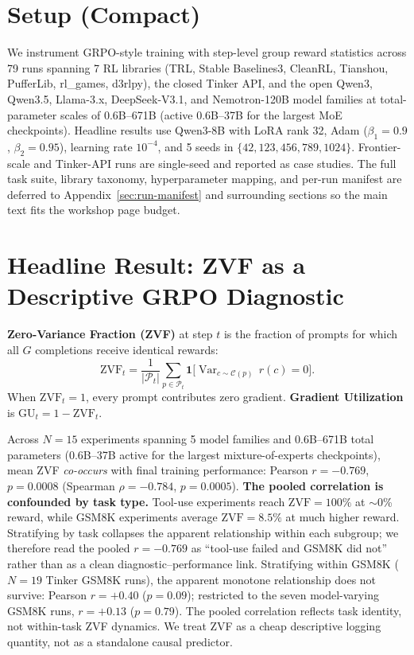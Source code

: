 \documentclass{article}
\begin{document}
\section{Setup (Compact)}
\label{sec:setup}


We instrument GRPO-style training with step-level group reward statistics
across 79 runs spanning 7 RL libraries (TRL, Stable Baselines3, CleanRL,
Tianshou, PufferLib, rl\_games, d3rlpy), the closed Tinker API, and the open
Qwen3, Qwen3.5, Llama-3.x, DeepSeek-V3.1, and Nemotron-120B model families at
total-parameter scales of 0.6B--671B (active 0.6B--37B for the largest MoE
checkpoints). Headline results use Qwen3-8B with LoRA rank 32, Adam
($\beta_1{=}0.9$, $\beta_2{=}0.95$), learning rate $10^{-4}$, and 5 seeds in
$\{42,123,456,789,1024\}$. Frontier-scale and Tinker-API runs are single-seed
and reported as case studies. The full task suite, library taxonomy,
hyperparameter mapping, and per-run manifest are deferred to
Appendix~\ref{sec:run-manifest} and surrounding sections so the main text fits
the workshop page budget.

\section{Headline Result: ZVF as a Descriptive GRPO Diagnostic}
\label{sec:zvf-analysis}


\textbf{Zero-Variance Fraction (ZVF)} at step $t$ is the fraction of prompts
for which all $G$ completions receive identical rewards:
\[
  \mathrm{ZVF}_t = \frac{1}{|\mathcal{P}_t|}\sum_{p \in \mathcal{P}_t}
  \mathbf{1}\bigl[\operatorname{Var}_{c \sim \mathcal{C}(p)}\,r(c) = 0\bigr].
\]
When $\mathrm{ZVF}_t = 1$, every prompt contributes zero gradient.
\textbf{Gradient Utilization} is $\mathrm{GU}_t = 1 - \mathrm{ZVF}_t$.

Across $N{=}15$ experiments spanning 5 model families and 0.6B--671B total
parameters (0.6B--37B active for the largest mixture-of-experts checkpoints),
mean ZVF \emph{co-occurs} with final training performance: Pearson
$r{=}-0.769$, $p{=}0.0008$ (Spearman $\rho{=}-0.784$, $p{=}0.0005$).
\textbf{The pooled correlation is confounded by task type.} Tool-use
experiments reach $\mathrm{ZVF}=100\%$ at $\sim$0\% reward, while GSM8K
experiments average $\mathrm{ZVF}=8.5\%$ at much higher reward. Stratifying
by task collapses the apparent relationship within each subgroup; we
therefore read the pooled $r=-0.769$ as ``tool-use failed and GSM8K did not''
rather than as a clean diagnostic--performance link.
Stratifying within GSM8K ($N{=}19$ Tinker GSM8K runs), the apparent monotone
relationship does not survive: Pearson $r{=}+0.40$ ($p{=}0.09$); restricted to
the seven model-varying GSM8K runs, $r{=}+0.13$ ($p{=}0.79$). The pooled
correlation reflects task identity, not within-task ZVF dynamics.
We treat ZVF as a cheap descriptive logging quantity, not as a standalone
causal predictor.
\end{document}

